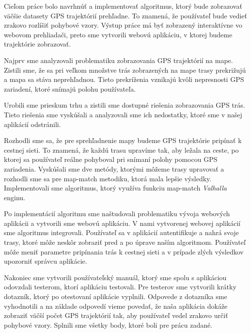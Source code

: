 \indent Cieľom práce bolo navrhnúť a implementovať algoritmus, ktorý bude zobrazovať väčšie datasety GPS trajektórií prehľadne. To znamená, že používateľ bude vedieť zrakovo rozlíšiť pohybové vzory. Výstup práce má byť zobrazený interaktívne vo webovom prehliadači, preto sme vytvorili webovú aplikáciu, v ktorej budeme trajektórie zobrazovať. 

Najprv sme analyzovali problematiku zobrazovania GPS trajektórií na mape. Zistili sme, že sa pri veľkom množstve trás zobrazených na mape trasy prekrižujú a mapa sa stáva neprehľadnou. Tieto prekríženia vznikajú kvôli nepresnosti GPS zariadení, ktoré snímajú polohu používateľa. 

Urobili sme prieskum trhu a zistili sme dostupné riešenia zobrazovania GPS trás. Tieto riešenia sme vyskúšali a analyzovali sme ich nedostatky, ktoré sme v našej aplikácií odstránili. 

Rozhodli sme sa, že pre sprehľadnenie mapy budeme GPS trajektórie pripínať k cestnej sieti. To znamená, že každú trasu upravíme tak, aby ležala na ceste, po ktorej sa používateľ reálne pohyboval pri snímaní polohy pomocou GPS zariadenia. Vyskúšali sme dve metódy, ktorými môžeme trasy upravovať a rozhodli sme sa pre map-match metodiku, ktorá mala lepšie výsledky. Implementovali sme algoritmus, ktorý využíva funkciu map-match \textit{Valhalla} enginu. 

Po implementácií algoritmu sme naštudovali problematiku vývoja webových aplikácii a vytvorili sme webovú aplikáciu. V nami vytvorenej webovej aplikácií sme algoritmus integrovali. Používateľ sa v aplikácií autentifikuje a nahrá svoje trasy, ktoré môže neskôr zobraziť pred a po úprave naším algoritmom. Používateľ môže meniť parametre pripínania trás k cestnej sieti a v prípade zlých výsledkov upozorniť správcu aplikácie. 

Nakoniec sme vytvorili používateľský manuál, ktorý sme spolu s aplikáciou odovzdali testerom, ktorí aplikáciu testovali. Pre testerov sme vytvorili krátky dotazník, ktorý po otestovaní aplikácie vyplnili. Odpovede z dotazníka sme vyhodnotili a na základe odpovedí vieme povedať, že naša aplikácia dokáže zobraziť väčší počet GPS trajektórií tak, aby používateľ vedel zrakovo určiť pohybové vzory. Splnili sme všetky body, ktoré boli pre prácu zadané.